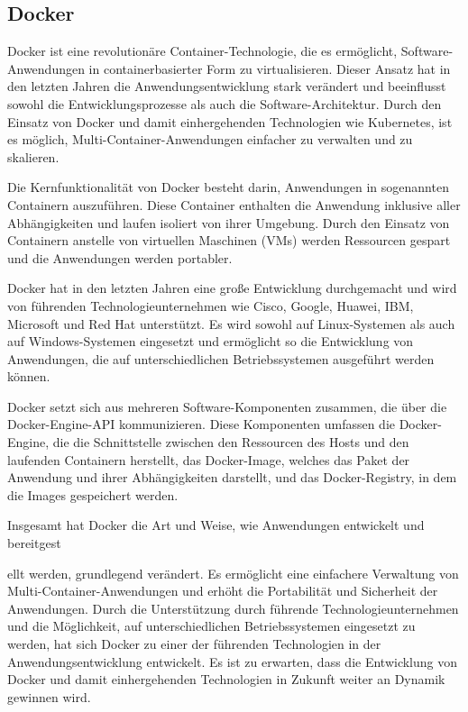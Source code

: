 \subsection{Docker}

Docker ist eine revolutionäre Container-Technologie, die es ermöglicht, Software-Anwendungen in containerbasierter Form zu virtualisieren. Dieser Ansatz hat in den letzten Jahren die Anwendungsentwicklung stark verändert und beeinflusst sowohl die Entwicklungsprozesse als auch die Software-Architektur. Durch den Einsatz von Docker und damit einhergehenden Technologien wie Kubernetes, ist es möglich, Multi-Container-Anwendungen einfacher zu verwalten und zu skalieren.

Die Kernfunktionalität von Docker besteht darin, Anwendungen in sogenannten Containern auszuführen. Diese Container enthalten die Anwendung inklusive aller Abhängigkeiten und laufen isoliert von ihrer Umgebung. Durch den Einsatz von Containern anstelle von virtuellen Maschinen (VMs) werden Ressourcen gespart und die Anwendungen werden portabler.

Docker hat in den letzten Jahren eine große Entwicklung durchgemacht und wird von führenden Technologieunternehmen wie Cisco, Google, Huawei, IBM, Microsoft und Red Hat unterstützt. Es wird sowohl auf Linux-Systemen als auch auf Windows-Systemen eingesetzt und ermöglicht so die Entwicklung von Anwendungen, die auf unterschiedlichen Betriebssystemen ausgeführt werden können.

Docker setzt sich aus mehreren Software-Komponenten zusammen, die über die Docker-Engine-API kommunizieren. Diese Komponenten umfassen die Docker-Engine, die die Schnittstelle zwischen den Ressourcen des Hosts und den laufenden Containern herstellt, das Docker-Image, welches das Paket der Anwendung und ihrer Abhängigkeiten darstellt, und das Docker-Registry, in dem die Images gespeichert werden.

Insgesamt hat Docker die Art und Weise, wie Anwendungen entwickelt und bereitgest

ellt werden, grundlegend verändert. Es ermöglicht eine einfachere Verwaltung von Multi-Container-Anwendungen und erhöht die Portabilität und Sicherheit der Anwendungen. Durch die Unterstützung durch führende Technologieunternehmen und die Möglichkeit, auf unterschiedlichen Betriebssystemen eingesetzt zu werden, hat sich Docker zu einer der führenden Technologien in der Anwendungsentwicklung entwickelt. Es ist zu erwarten, dass die Entwicklung von Docker und damit einhergehenden Technologien in Zukunft weiter an Dynamik gewinnen wird.

